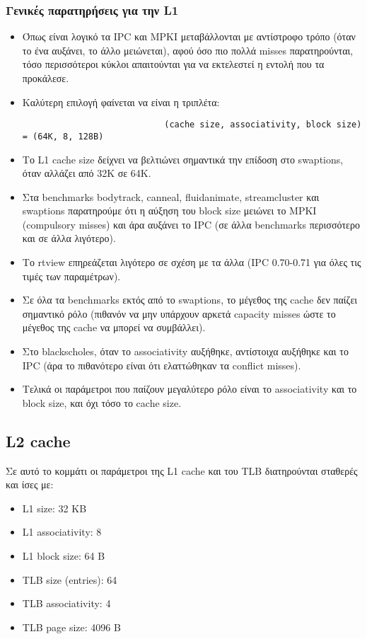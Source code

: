\documentclass[12pt,a4paper]{article}
\begin{document}
			\subsubsection{Γενικές παρατηρήσεις για την L1}
				\begin{itemize}
					\item Όπως είναι λογικό τα IPC και MPKI μεταβάλλονται με αντίστροφο τρόπο (όταν το ένα αυξάνει, το άλλο μειώνεται), αφού όσο πιο πολλά misses παρατηρούνται, τόσο περισσότεροι κύκλοι απαιτούνται για να εκτελεστεί η εντολή που τα προκάλεσε.
					\item Καλύτερη επιλογή φαίνεται να είναι η τριπλέτα:
					
						\begin{verbatim}
							(cache size, associativity, block size) = (64K, 8, 128B)
						\end{verbatim} 
					\item Το L1 cache size δείχνει να βελτιώνει σημαντικά την επίδοση στο swaptions, όταν αλλάζει από 32K σε 64K.
					\item Στα benchmarks bodytrack, canneal, fluidanimate, streamcluster και swaptions παρατηρούμε ότι η αύξηση του block size μειώνει το MPKI (compulsory misses) και άρα αυξάνει το IPC (σε άλλα benchmarks περισσότερο και σε άλλα λιγότερο). 
					\item Το rtview επηρεάζεται λιγότερο σε σχέση με τα άλλα (IPC 0.70-0.71 για όλες τις τιμές των παραμέτρων).
					\item Σε όλα τα benchmarks εκτός από το swaptions, το μέγεθος της cache δεν παίζει σημαντικό ρόλο (πιθανόν να μην υπάρχουν αρκετά capacity misses ώστε το μέγεθος της cache να μπορεί να συμβάλλει).
					\item Στο blackscholes, όταν το associativity αυξήθηκε, αντίστοιχα αυξήθηκε και το IPC (άρα το πιθανότερο είναι ότι ελαττώθηκαν τα conflict misses).
					\item Τελικά οι παράμετροι που παίζουν μεγαλύτερο ρόλο είναι το associativity και το block size, και όχι τόσο το cache size.	
				\end{itemize}
			
		\subsection{L2 cache}
			Σε αυτό το κομμάτι οι παράμετροι της L1 cache και του TLB διατηρούνται σταθερές και ίσες με:

			\begin{itemize}
				\item L1 size: 32 KB
				\item L1 associativity: 8
				\item L1 block size: 64 B
				\item TLB size (entries): 64
				\item TLB associativity: 4
				\item TLB page size: 4096 B
			\end{itemize}
	
\end{document}
